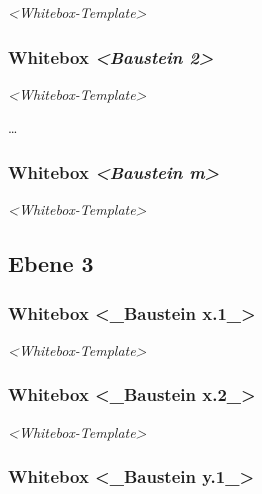 \documentclass[
]{article}
\begin{document}
\emph{\textless Whitebox-Template\textgreater{}}

\hypertarget{_whitebox_emphasis_baustein_2_emphasis}{%
\subsubsection{\texorpdfstring{Whitebox \emph{\textless Baustein
2\textgreater{}}}{Whitebox \textless Baustein 2\textgreater{}}}\label{_whitebox_emphasis_baustein_2_emphasis}}

\emph{\textless Whitebox-Template\textgreater{}}

\ldots{}

\hypertarget{_whitebox_emphasis_baustein_m_emphasis}{%
\subsubsection{\texorpdfstring{Whitebox \emph{\textless Baustein
m\textgreater{}}}{Whitebox \textless Baustein m\textgreater{}}}\label{_whitebox_emphasis_baustein_m_emphasis}}

\emph{\textless Whitebox-Template\textgreater{}}

\hypertarget{_ebene_3}{%
\subsection{Ebene 3}\label{_ebene_3}}

\hypertarget{_whitebox_baustein_x_1}{%
\subsubsection{Whitebox \textless\_Baustein
x.1\_\textgreater{}}\label{_whitebox_baustein_x_1}}

\emph{\textless Whitebox-Template\textgreater{}}

\hypertarget{_whitebox_baustein_x_2}{%
\subsubsection{Whitebox \textless\_Baustein
x.2\_\textgreater{}}\label{_whitebox_baustein_x_2}}

\emph{\textless Whitebox-Template\textgreater{}}

\hypertarget{_whitebox_baustein_y_1}{%
\subsubsection{Whitebox \textless\_Baustein
y.1\_\textgreater{}}\label{_whitebox_baustein_y_1}}
\end{document}
